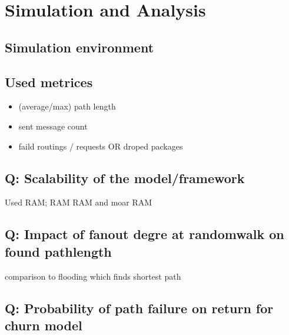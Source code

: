 \chapter{Simulation and Analysis}


\section{Simulation environment}
\section{Used metrices}
\begin{itemize}
\item        (average/max) path length
\item        sent message count
\item        faild routings / requests OR droped packages
\end{itemize}
\section{Q: Scalability of the model/framework}
        Used RAM; RAM RAM and moar RAM
\section{Q: Impact of fanout degre at randomwalk on found pathlength}
        comparison to flooding which finds shortest path
\section{Q: Probability of path failure on return for churn model}

